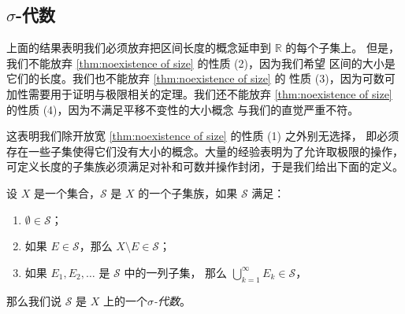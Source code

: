 \documentclass[fontset=none]{Notes}
\begin{document}
\subsection{$\sigma$-代数}

上面的结果表明我们必须放弃把区间长度的概念延申到 $\mathbb{R}$ 的每个子集上。
但是，我们不能放弃 \autoref{thm:noexistence of size} 的性质 (2)，因为我们希望
区间的大小是它们的长度。我们也不能放弃 \autoref{thm:noexistence of size} 的
性质 (3)，因为可数可加性需要用于证明与极限相关的定理。我们还不能放弃
\autoref{thm:noexistence of size} 的性质 (4)，因为不满足平移不变性的大小概念
与我们的直觉严重不符。

这表明我们除开放宽 \autoref{thm:noexistence of size} 的性质 (1) 之外别无选择，
即必须存在一些子集使得它们没有大小的概念。大量的经验表明为了允许取极限的操作，
可定义长度的子集族必须满足对补和可数并操作封闭，于是我们给出下面的定义。

\begin{definition}
  设 $X$ 是一个集合，$\mathcal{S}$ 是 $X$ 的一个子集族，如果 $\mathcal{S}$
  满足：
  \begin{enumerate}
    \item $\emptyset\in \mathcal{S}$；
    \item 如果 $E\in \mathcal{S}$，那么 $X\setminus E\in \mathcal{S}$；
    \item 如果 $E_1,E_2,\dots$ 是 $\mathcal{S}$ 中的一列子集，
    那么 $\bigcup_{k=1}^\infty E_k\in \mathcal{S}$，
  \end{enumerate}
  那么我们说 $\mathcal{S}$ 是 $X$ 上的一个\emph{$\sigma$-代数}。
\end{definition}
\end{document}
